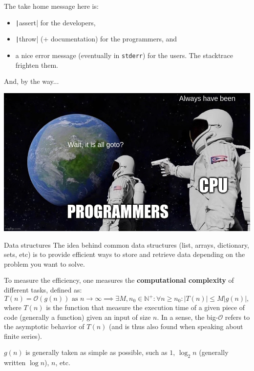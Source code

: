 \documentclass[10pt,
aspectratio=169
]{beamer}
\begin{document}
\begin{frame}
	The take home message here is:\begin{itemize}
		\item \texttt|assert| for the developers,
		\item \texttt|throw| (+ documentation) for the programmers, and
		\item a nice error message (eventually in \texttt{stderr}) for the users. The stacktrace frighten them.
	\end{itemize}
	
	
	And, by the way...
	
	\begin{center}
		\includegraphics[width=.5\linewidth]{im/meme-goto}
	\end{center}
\end{frame}

\newcommand{\Ox}[1]{\ensuremath{\mathcal{O}(#1)}}

\begin{frame}{Data structures}
The idea behind common data structures (list, arrays, dictionary, sets, etc) is to provide efficient ways to store and retrieve data depending on the problem you want to solve.

To measure the efficiency, one measures the \textbf{computational complexity} of different tasks, defined as:\begin{equation*}
	T(n) = \mathcal{O}(g(n))  \text{ as } n\to\infty \implies \exists M, n_0\in\mathbb{N}^+: \forall n\geq n_0: |T(n)| \leq M |g(n)|,
\end{equation*}
where $T(n)$ is the function that measure the execution time of a given piece of code (generally a function) given an input of size $n$. In a sense, the big-$\mathcal{O}$ refers to the asymptotic behavior of $T(n)$ (and is thus also found when speaking about finite series). 

$g(n)$ is generally taken as simple as possible, such as $1$, $\log_2 n$ (generally written $\log n$), $n$, etc.
\end{frame}
\end{document}
